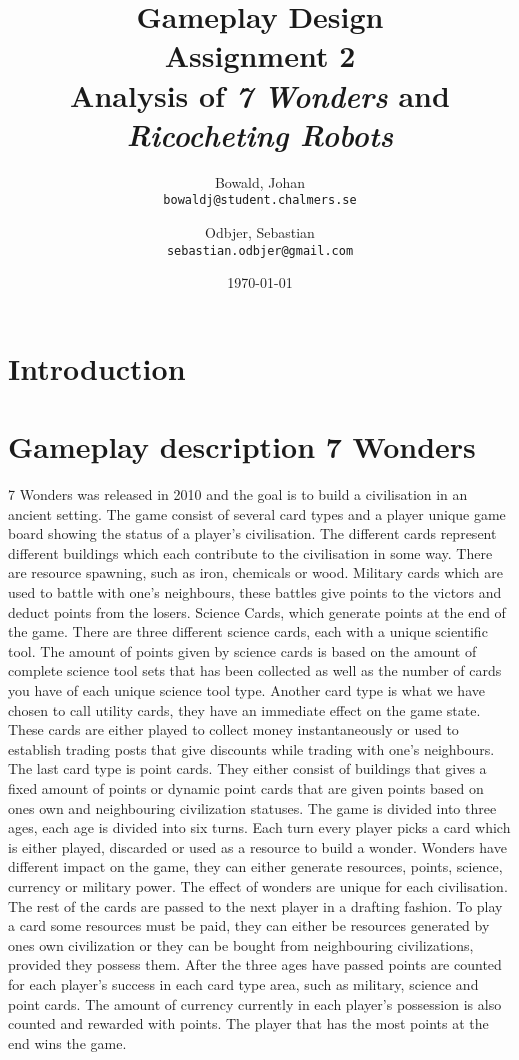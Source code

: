\documentclass[a4paper]{article}
\title{Gameplay Design \\ Assignment 2 \\ Analysis of \textit{7 Wonders} and \textit{Ricocheting Robots} }
\author{
  Bowald, Johan\\
  \texttt{bowaldj@student.chalmers.se}
  \and
  Odbjer, Sebastian\\
  \texttt{sebastian.odbjer@gmail.com}
}
\date{\today}
\begin{document}
\maketitle
\newpage
\tableofcontents{}
\newpage
\section{Introduction}

\section{Gameplay description 7 Wonders}
\label{sec:what7wond}
7 Wonders was released in 2010 and the goal is to build a civilisation in an ancient setting.
The game consist of several card types and a player unique game board showing the status of a player's civilisation.
The different cards represent different buildings which each contribute to the civilisation in some way.
There are resource spawning, such as iron, chemicals or wood. Military cards which are used to battle with one's neighbours, these battles give points to the victors and deduct points from the losers.
Science Cards, which generate points at the end of the game. There are three different science cards, each with a unique scientific tool.
The amount of points given by science cards is based on the amount of complete science tool sets that has been collected as well as the number of cards you have of each unique science tool type.
Another card type is what we have chosen to call utility cards, they have an immediate effect on the game state.
These cards are either played to collect money instantaneously or used to establish trading posts that give discounts while trading with one's neighbours.
The last card type is point cards.
They either consist of buildings that gives a fixed amount of points or dynamic point cards that are given points based on ones own and neighbouring civilization statuses.
The game is divided into three ages, each age is divided into six turns.
Each turn every player picks a card which is either played, discarded or used as a resource to build a wonder.
Wonders have different impact on the game, they can either generate resources, points, science, currency or military power.
The effect of wonders are unique for each civilisation.
The rest of the cards are passed to the next player in a drafting fashion.
To play a card some resources must be paid, they can either be resources generated by ones own civilization or they can be bought from neighbouring civilizations, provided they possess them.
After the three ages have passed points are counted for each player's success in each card type area, such as military, science and point cards.
The amount of currency currently in each player's possession is also counted and rewarded with points.
The player that has the most points at the end wins the game.
\end{document}
